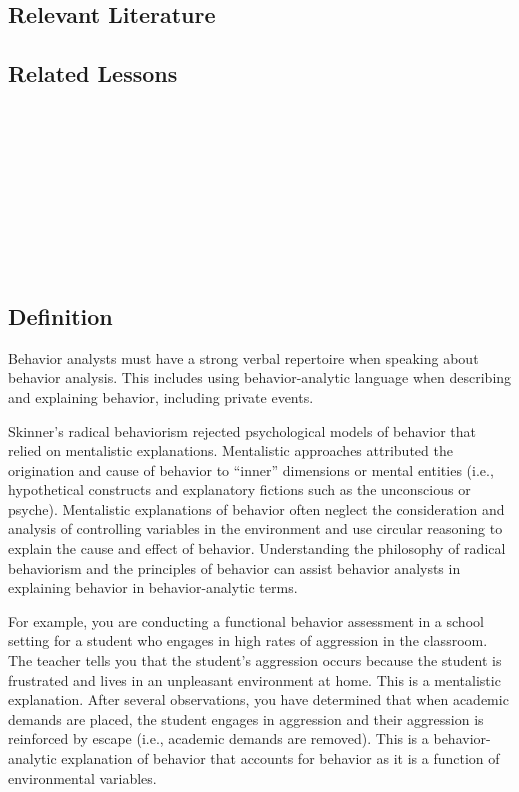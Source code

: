 \subsection{Relevant Literature}
\begin{refsection}
\nocite{bailey1991marketing,
        lindsley1991technical,
        malott1992should}
\printbibliography[heading=none]
\end{refsection}
\subsection{Related Lessons}
\fourgSix{}\\
\fouriSix{}\\
\fourjSix{}\\
\fourjSeven{}\\
\fourkOne{}\\
\fourkThree{}\\
\fourkEight{}\\
\fourkNine{}\\
%
\clearpage \section[\fourgFive{}]{\fourgFive{}%
              }
\subsection{Definition}
Behavior analysts must have a strong verbal repertoire when speaking about behavior analysis.  This includes using behavior-analytic language when describing and explaining behavior, including private events.  

Skinner's radical behaviorism rejected psychological models of behavior that relied on mentalistic explanations. Mentalistic approaches attributed the origination and cause of behavior to ``inner'' dimensions or mental entities (i.e., hypothetical constructs and explanatory fictions such as the unconscious or psyche).  Mentalistic explanations of behavior often neglect the consideration and analysis of controlling variables in the environment and use circular reasoning to explain the cause and effect of behavior.  Understanding the philosophy of radical behaviorism and the principles of behavior can assist behavior analysts in explaining behavior in behavior-analytic terms.

For example, you are conducting a functional behavior assessment in a school setting for a student who engages in high rates of aggression in the classroom.  The teacher tells you that the student's aggression occurs because the student is frustrated and lives in an unpleasant environment at home.  This is a mentalistic explanation.  After several observations, you have determined that when academic demands are placed, the student engages in aggression and their aggression is reinforced by escape (i.e., academic demands are removed). This is a behavior-analytic explanation of behavior that accounts for behavior as it is a function of environmental variables.  

